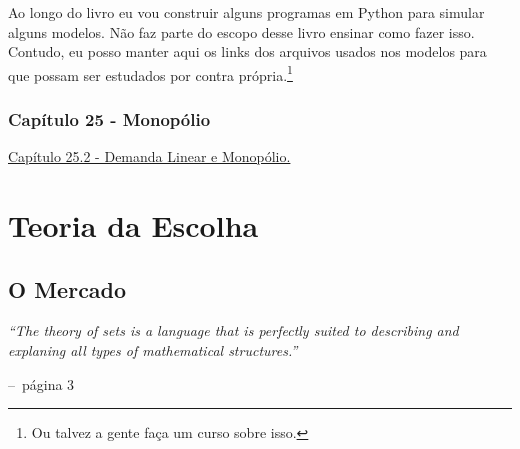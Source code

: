 \documentclass[a4paper,11pt,oneside]{book}
\makeatletter
\theoremstyle{definition}
\theoremstyle{break}
\newenvironment{chapquote}[2][2em]
  {\setlength{\@tempdima}{#1}%
   \def\chapquote@author{#2}%
   \parshape 1 \@tempdima \dimexpr\textwidth-2\@tempdima\relax%
   \itshape}
  {\par\normalfont\hfill--\ \chapquote@author\hspace*{\@tempdima}\par\bigskip}
\makeatother
\begin{document}
Ao longo do livro eu vou construir alguns programas em Python para simular alguns modelos. Não faz parte do escopo desse livro ensinar como fazer isso. Contudo, eu posso manter aqui os links dos arquivos usados nos modelos para que possam ser estudados por contra própria.\footnote{Ou talvez a gente faça um curso sobre isso.}

\section{Capítulo 25 - Monopólio}
\href{https://github.com/brunoruas2/Meus_Estudos/blob/main/Microeconomia/Microeconomics\%20-\%20Hal\%20Varian/models/cap25.2-demanda_linear_e_monopolio.py}{Capítulo 25.2 - Demanda Linear e Monopólio.}

\part{Teoria da Escolha}

\chapter{O Mercado}

\begin{chapquote}{página 3}
	``The theory of sets is a language that is perfectly suited to describing and explaning all types of mathematical structures.''
\end{chapquote}
\end{document}
